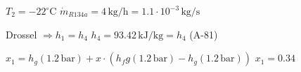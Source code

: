 \( T_2 = -22^\circ \text{C} \)  
\( \dot{m}_{R134a} = 4 \, \text{kg/h} = 1.1 \cdot 10^{-3} \, \text{kg/s} \)  

Drossel \( \Rightarrow h_1 = h_4 \)  
\( h_4 = 93.42 \, \text{kJ/kg} = h_4 \) (A-81)  

\( x_1 = h_g (1.2 \, \text{bar}) + x \cdot (h_fg (1.2 \, \text{bar}) - h_g (1.2 \, \text{bar})) \)  
\( x_1 = 0.34 \)